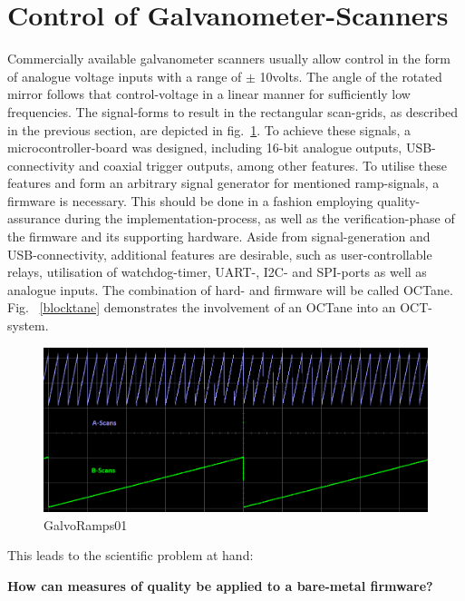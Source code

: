 \section{Control of Galvanometer-Scanners}
Commercially available galvanometer scanners usually allow control in the form of analogue voltage inputs with a range of $\pm$ 10volts. The angle of the rotated mirror follows that control-voltage in a linear manner for sufficiently low frequencies. The signal-forms to result in the rectangular scan-grids, as described in the previous section, are depicted in fig.~\ref{GalvoRamps01}. To achieve these signals, a microcontroller-board was designed, including 16-bit analogue outputs, USB-connectivity and coaxial trigger outputs, among other features. To utilise these features and form an arbitrary signal generator for mentioned ramp-signals, a firmware is necessary. This should be done in a fashion employing quality-assurance during the implementation-process, as well as the verification-phase of the firmware and its supporting hardware. Aside from signal-generation and USB-connectivity, additional features are desirable, such as user-controllable relays, utilisation of watchdog-timer, UART-, I2C- and SPI-ports as well as analogue inputs. The combination of hard- and firmware will be called OCTane. Fig. ~\ref{blocktane} demonstrates the involvement of an OCTane into an OCT-system.

\begin{figure}[h!]	\centering	\includegraphics[width=\textwidth]{images/GalvoRamps01.png}	\caption{GalvoRamps01}	\label{GalvoRamps01}	\end{figure}
This leads to the scientific problem at hand: 
\begin{center} {\bf How can measures of quality be applied to a bare-metal firmware?}
\end{center}

